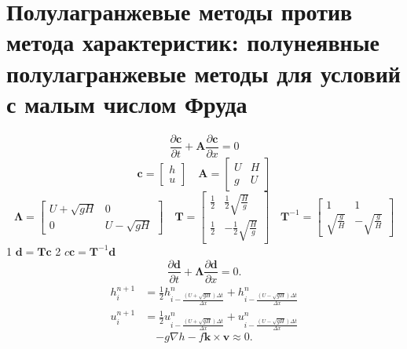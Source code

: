 \chapter{Полулагранжевые методы против метода характеристик: полунеявные полулагранжевые методы для условий с малым числом Фруда} \label{chapt_8}
%
\begin{equation}
\label{eq:equation8_1}
\frac{\partial\mathbf{c}}{\partial t} + \mathbf{A}\frac{\partial \mathbf{c}}{\partial{x}} = 0
\end{equation}
%
%
\begin{equation*}
\mathbf{c} = \begin{bmatrix}
h \\
u
\end{bmatrix}
 \quad
\mathbf{A} = \begin{bmatrix}
	U & H\\
	g & U
\end{bmatrix}
\end{equation*}
%
%
\begin{equation*}
\mathbf{\Lambda} = \begin{bmatrix}
U + \sqrt{gH} & 0\\
0 & U - \sqrt{gH}
\end{bmatrix}
\quad
\mathbf{T} = \begin{bmatrix}
\frac{1}{2} & \frac{1}{2}\sqrt{\frac{H}{g}}\\
\frac{1}{2}  & -\frac{1}{2} \sqrt{\frac{H}{g}}
\end{bmatrix}
\quad
\mathbf{T}^{-1} = \begin{bmatrix}
1 & 1\\
\sqrt{\frac{g}{H}}  & -\sqrt{\frac{g}{H}}
\end{bmatrix}
\end{equation*}
%
1 $\mathbf{d}=\mathbf{T}\mathbf{c}$ 2 $c\mathbf{c}=\mathbf{T}^{-1}\mathbf{d}$
%
\begin{equation}
\label{eq:equation8_2}
\frac{\partial\mathbf{d}}{\partial t} + \mathbf{\Lambda}\frac{\partial \mathbf{d}}{\partial{x}} = 0.
\end{equation}
%
%
\begin{align}
\label{eq:equation8_3}
h_i^{n+1}&=\frac{1}{2}h_{i-\frac{(U+\sqrt{gH})\Delta t}{\Delta x}}^n+h_{i-\frac{(U-\sqrt{gH})\Delta t}{\Delta x}}^n \nonumber \\ 
u_i^{n+1}&=\frac{1}{2}u_{i-\frac{(U+\sqrt{gH})\Delta t}{\Delta x}}^n+u_{i-\frac{(U-\sqrt{gH})\Delta t}{\Delta x}}^n
\end{align}
%
%
\begin{equation}
\label{eq:equation8_4}
-g\nabla h - f\mathbf{k}\times\mathbf{v}\approx 0.
\end{equation}
